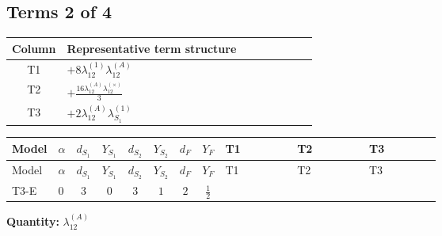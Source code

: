 \documentclass[8pt]{article}
\begin{document}
\begin{landscape}
\subsection*{Terms 2 of 4}
\begin{center}
\begin{tabular}{@{}c >{\raggedright\arraybackslash}p{0.82\linewidth}@{}}
\toprule
Column & Representative term structure \\
\midrule
T1 & \(\displaystyle +8 {\lambda_{12}^{(1)}} {\lambda_{12}^{(A)}}\) \\
\midrule
T2 & \(\displaystyle +\frac{16 {\lambda_{12}^{(A)}} {\lambda_{12}^{(\times)}}}{3}\) \\
\midrule
T3 & \(\displaystyle +2 {\lambda_{12}^{(A)}} {\lambda_{S_1}^{(1)}}\) \\
\midrule
\bottomrule
\end{tabular}
\end{center}
\smallskip
\tiny
\begin{longtable}{@{}llcccccc >{\raggedright\arraybackslash}p{0.21\linewidth} >{\raggedright\arraybackslash}p{0.21\linewidth} >{\raggedright\arraybackslash}p{0.21\linewidth}@{}}
\toprule
Model & $\alpha$ & $d_{S_1}$ & $Y_{S_1}$ & $d_{S_2}$ & $Y_{S_2}$ & $d_F$ & $Y_F$ & T1 & T2 & T3 \\
\midrule
\endfirsthead
\toprule
Model & $\alpha$ & $d_{S_1}$ & $Y_{S_1}$ & $d_{S_2}$ & $Y_{S_2}$ & $d_F$ & $Y_F$ & T1 & T2 & T3 \\
\midrule
\endhead
T3-E & $0$ & $3$ & $0$ & $3$ & $1$ & $2$ & $\frac{1}{2}$ & \scriptsize\adjustbox{max width=\linewidth}{$\begin{gathered} +8 {\lambda_{12}^{(1)}} {\lambda_{12}^{(A)}}\end{gathered}$} & \scriptsize\adjustbox{max width=\linewidth}{$\begin{gathered} +\frac{16 {\lambda_{12}^{(A)}} {\lambda_{12}^{(\times)}}}{3}\end{gathered}$} & \scriptsize\adjustbox{max width=\linewidth}{$\begin{gathered} +2 {\lambda_{12}^{(A)}} {\lambda_{S_1}^{(1)}}\end{gathered}$} \\
\midrule
\bottomrule
\end{longtable}
\clearpage
\noindent\textbf{Quantity: }$\lambda_{12}^{(A)}$\par\smallskip

\end{landscape}
\end{document}
